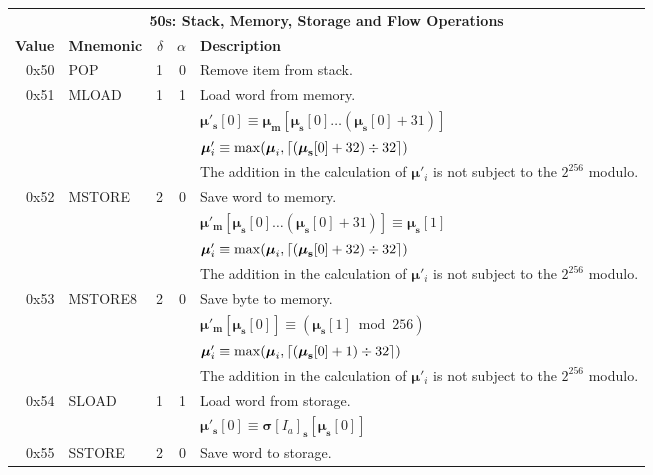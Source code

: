 \documentclass[9pt,oneside]{amsart}
\DeclarePairedDelimiter{\ceil}{\lceil}{\rceil}
\begin{document}
\begin{tabular*}{\columnwidth}[h]{rlrrl}
\toprule
\multicolumn{5}{c}{\textbf{50s: Stack, Memory, Storage and Flow Operations}} \vspace{5pt} \\
\textbf{Value} & \textbf{Mnemonic} & $\delta$ & $\alpha$ & \textbf{Description} \vspace{5pt} \\
0x50 & {\small POP} & 1 & 0 & Remove item from stack. \\
\midrule
0x51 & {\small MLOAD} & 1 & 1 & Load word from memory. \\
&&&& $\boldsymbol{\mu}'_\mathbf{s}[0] \equiv \boldsymbol{\mu}_\mathbf{m}[\boldsymbol{\mu}_\mathbf{s}[0] \dots (\boldsymbol{\mu}_\mathbf{s}[0] + 31) ]$ \\
&&&& $\boldsymbol{\mu}'_i \equiv \max(\boldsymbol{\mu}_i, \ceil{ (\boldsymbol{\mu}_\mathbf{s}[0] + 32) \div 32 })$ \\
&&&& The addition in the calculation of $\boldsymbol{\mu}'_i$ is not subject to the $2^{256}$ modulo. \\
\midrule
0x52 & {\small MSTORE} & 2 & 0 & Save word to memory. \\
&&&& $\boldsymbol{\mu}'_\mathbf{m}[ \boldsymbol{\mu}_\mathbf{s}[0] \dots (\boldsymbol{\mu}_\mathbf{s}[0] + 31) ] \equiv \boldsymbol{\mu}_\mathbf{s}[1]$ \\
&&&& $\boldsymbol{\mu}'_i \equiv \max(\boldsymbol{\mu}_i, \ceil{ (\boldsymbol{\mu}_\mathbf{s}[0] + 32) \div 32 })$ \\
&&&& The addition in the calculation of $\boldsymbol{\mu}'_i$ is not subject to the $2^{256}$ modulo. \\
\midrule
0x53 & {\small MSTORE8} & 2 & 0 & Save byte to memory. \\
&&&& $\boldsymbol{\mu}'_\mathbf{m}[ \boldsymbol{\mu}_\mathbf{s}[0] ] \equiv (\boldsymbol{\mu}_\mathbf{s}[1] \bmod 256) $ \\
&&&& $\boldsymbol{\mu}'_i \equiv \max(\boldsymbol{\mu}_i, \ceil{ (\boldsymbol{\mu}_\mathbf{s}[0] + 1) \div 32 })$ \\
&&&& The addition in the calculation of $\boldsymbol{\mu}'_i$ is not subject to the $2^{256}$ modulo. \\
\midrule
0x54 & {\small SLOAD} & 1 & 1 & Load word from storage. \\
&&&& $\boldsymbol{\mu}'_\mathbf{s}[0] \equiv \boldsymbol{\sigma}[I_a]_\mathbf{s}[\boldsymbol{\mu}_\mathbf{s}[0]]$ \\
\midrule
0x55 & {\small SSTORE} & 2 & 0 & Save word to storage. \\

\end{tabular*}
\end{document}
